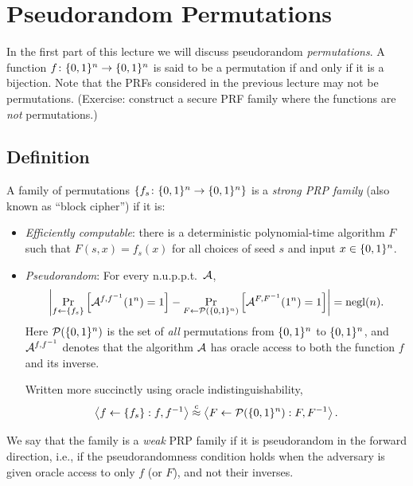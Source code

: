 \documentclass[11pt]{article}
\begin{document}
\thispagestyle{fancy}           %


\section{Pseudorandom Permutations}
\label{sec:pseud-perm}

In the first part of this lecture we will discuss pseudorandom
\emph{permutations}.  A function $f \colon \bit^n \to \bit^n$ is said
to be a permutation if and only if it is a bijection.  Note that the
PRFs considered in the previous lecture may not be permutations.
(Exercise: construct a secure PRF family where the functions are
\emph{not} permutations.)

\subsection{Definition}
\label{sec:definition}

\begin{definition}
  \label{def:prp}
  A family of permutations $\set{f_s \colon \bit^{n} \to \bit^{n}}$ is
  a \emph{strong PRP family} (also known as ``block cipher'') if it
  is:
  \begin{itemize}
  \item \emph{Efficiently computable}: there is a deterministic
    polynomial-time algorithm $F$ such that $F(s,x) = f_s(x)$ for all
    choices of seed $s$ and input $x \in \bit^{n}$.
  \item \emph{Pseudorandom}: For every n.u.p.p.t.~$\Adv$,
    \[ \abs*{ \Pr_{f \gets \set{f_{s}} } \left[ \Adv^{f,f^{-1}}
        (1^n) = 1 \right] - \Pr_{F \gets \mathcal{P}(\bit^n)} \left[
        \mathcal A^{F,F^{-1}} (1^n) = 1 \right] } = \negl(n). \] Here
    $\mathcal{P}(\bit^n)$ is the set of \emph{all} permutations from
    $\bit^n$ to $\bit^n$, and $\Adv^{f,f^{-1}}$ denotes that the
    algorithm $\Adv$ has oracle access to both the function $f$ and
    its inverse.

    Written more succinctly using oracle indistinguishability, \[
    \left\langle f \gets \set{f_{s}} : f, f^{-1} \right\rangle
    \compind \left\langle F \gets \mathcal{P}(\bit^{n}) : F, F^{-1}
    \right\rangle. \]
  \end{itemize}
  
  We say that the family is a \emph{weak} PRP family if it is
  pseudorandom in the forward direction, i.e., if the pseudorandomness
  condition holds when the adversary is given oracle access to only
  $f$ (or $F$), and not their inverses.
\end{definition}
\end{document}
